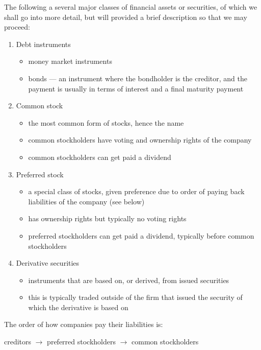 \documentclass[notoc,notitlepage]{tufte-book}
\begin{document}
The following a several major classes of financial assets
or securities, of which we shall go into more detail,
but will provided a brief description so that we may proceed:
\begin{enumerate}
  \item Debt instruments
    \begin{itemize}
      \item money market instruments
      \item bonds --- an instrument where the bondholder is the creditor,
        and the payment is usually in terms of interest and a final
        maturity payment
    \end{itemize}
  \item Common stock
    \begin{itemize}
      \item the most common form of stocks, hence the name
      \item common stockholders have voting and ownership rights
        of the company
      \item common stockholders can get paid a dividend
    \end{itemize}
  \item Preferred stock
    \begin{itemize}
      \item a special class of stocks, given preference
        due to order of paying back liabilities of the company
        (see below)
      \item has ownership rights but typically no voting rights
      \item preferred stockholders can get paid a dividend,
        typically before common stockholders
    \end{itemize}
  \item Derivative securities
    \begin{itemize}
      \item instruments that are based on, or derived, from
        issued securities
      \item this is typically traded outside of the firm that
        issued the security of which the derivative is based on
    \end{itemize}
\end{enumerate}

The order of how companies pay their liabilities is:
\begin{center}
  creditors $\to$ preferred stockholders $\to$ common stockholders
\end{center}
\end{document}
